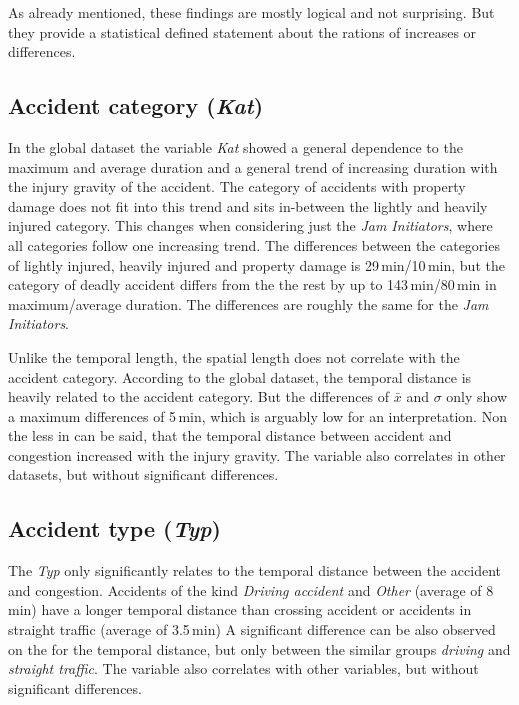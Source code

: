 As already mentioned, these findings are mostly logical and not surprising. But they provide a statistical defined statement about the rations of increases or differences. 

\subsection{Accident category (\textit{Kat})}
\label{analysis_sum_Kat}
In the global dataset the variable \textit{Kat} showed a general dependence to the maximum and average duration and a general trend of increasing duration with the injury gravity of the accident. The category of accidents with property damage does not fit into this trend and sits in-between the lightly and heavily injured category. This changes when considering just the \textit{Jam Initiators}, where all categories follow one increasing trend. The differences between the categories of lightly injured, heavily injured and property damage is 29\,min/10\,min, but the category of deadly accident differs from the the rest by up to 143\,min/80\,min in maximum/average duration. The differences are roughly the same for the \textit{Jam Initiators}.

Unlike the temporal length, the spatial length does not correlate with the accident category. According to the global dataset, the temporal distance is heavily related to the accident category. But the differences of $\bar{x}$ and $\sigma$ only show a maximum differences of 5\,min, which is arguably low for an interpretation. Non the less in can be said, that the temporal distance between accident and congestion increased with the injury gravity. The variable also correlates in other datasets, but without significant differences.

\subsection{Accident type (\textit{Typ})}
The \textit{Typ} only significantly relates to the temporal distance between the accident and congestion. Accidents of the kind \textit{Driving accident} and \textit{Other} (average of 8\,min) have a longer temporal distance than crossing accident or accidents in straight traffic (average of 3.5\,min) A significant difference can be also observed on the  for the temporal distance, but only between the similar groups \textit{driving} and \textit{straight traffic}. The variable also correlates with other variables, but without significant differences.

